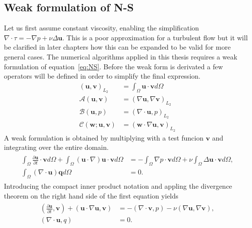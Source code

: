 \subsection{Weak formulation of N-S}
Let us first assume constant viscosity, enabling the simplification $\nabla \cdot \tau = -\nabla p + \nu \Delta \mathbf{u}$.
This is a poor approximation for a turbulent flow but it will be clarified in later chapters how this can be expanded
to be valid for more general cases.
The numerical algorithms applied in this thesis requires a weak formulation of equation~\ref{eq:NS}.
Before the weak form is derivated a few operators will be defined in order to simplify the final 
expression.
%
\begin{align}
    ( \mathbf{u},\mathbf{v})_{L_2} &= \int_{\Omega}\mathbf{u} \cdot \mathbf{v} d\Omega\\
    \mathcal{A}(\mathbf{u},\mathbf{v}) &= (\nabla \mathbf{u},\nabla \mathbf{v})_{L_2}\\
    \mathcal{B}(\mathbf{u},p) &= (\nabla \cdot \mathbf{u},p)_{L_2}\\
    \mathcal{C}(\mathbf{w};\mathbf{u},\mathbf{v}) &= (\mathbf{w}\cdot \nabla \mathbf{u},\mathbf{v})_{L_2}
    \label{eq:weakoperators}
\end{align}
%
A weak formulation is obtained by multiplying with a test funcion $\mathbf{v}$ and integrating over
the entire domain.
\begin{align}
    \begin{split}
        \int_{\Omega}\frac{\partial \mathbf{u}}{\partial t}\cdot\mathbf{v}d\Omega
        + \int_{\Omega}(\mathbf{u}\cdot \nabla)\mathbf{u}\cdot\mathbf{v}d\Omega
        &= -\int_{\Omega}\nabla p\cdot \mathbf{v} d\Omega 
        + \nu \int_{\Omega}\Delta\mathbf{u}\cdot\mathbf{v}d\Omega, \\
		\int_{\Omega}(\nabla \cdot \mathbf{u}) \mathbf{q}d\Omega &= 0.
    \end{split}
	\label{eq:NSweak1}
\end{align}
Introducing the compact inner product notation and appling the divergence theorem on the right hand side of 
the first equation yields
\begin{align}
    \begin{split}
        (\frac{\partial \mathbf{u}}{\partial t},\mathbf{v})
        + (\mathbf{u}\cdot \nabla\mathbf{u},\mathbf{v})
        &= -(\nabla \cdot \mathbf{v} , p ) 
        -\nu(\nabla \mathbf{u},\nabla \mathbf{v}), \\
		(\nabla \cdot \mathbf{u},q) &= 0.
    \end{split}
	\label{eq:NSweak}
\end{align}

